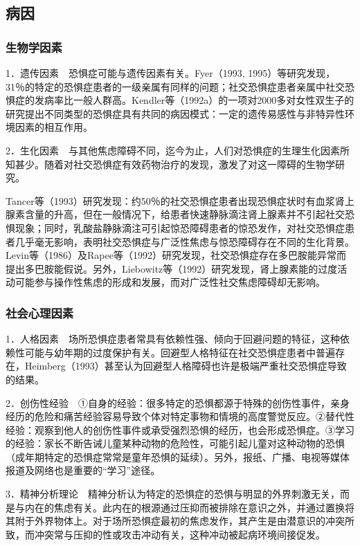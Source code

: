 \subsection{病因}

\subsubsection{生物学因素}

1．遗传因素　恐惧症可能与遗传因素有关。Fyer（1993,
1995）等研究发现，31％的特定的恐惧症患者的一级亲属有同样的问题；社交恐惧症患者亲属中社交恐惧症的发病率比一般人群高。Kendler等（1992a）的一项对2000多对女性双生子的研究提出不同类型的恐惧症具有共同的病因模式：一定的遗传易感性与非特异性环境因素的相互作用。

2．生化因素　与其他焦虑障碍不同，迄今为止，人们对恐惧症的生理生化因素所知甚少。随着对社交恐惧症有效药物治疗的发现，激发了对这一障碍的生物学研究。

Tancer等（1993）研究发现：约50％的社交恐惧症患者出现恐惧症状时有血浆肾上腺素含量的升高，但在一般情况下，给患者快速静脉滴注肾上腺素并不引起社交恐惧现象；同时，乳酸盐静脉滴注可引起惊恐障碍患者的惊恐发作，对社交恐惧症患者几乎毫无影响，表明社交恐惧症与广泛性焦虑与惊恐障碍存在不同的生化背景。Levin等（1986）及Rapee等（1992）研究发现，社交恐惧症存在多巴胺能异常而提出多巴胺能假说。另外，Liebowitz等（1992）研究发现，肾上腺素能的过度活动可能参与操作性焦虑的形成和发展，而对广泛性社交焦虑障碍却无影响。

\subsubsection{社会心理因素}

1．人格因素　场所恐惧症患者常具有依赖性强、倾向于回避问题的特征，这种依赖性可能与幼年期的过度保护有关。回避型人格特征在社交恐惧症患者中普遍存在，Heimberg（1993）甚至认为回避型人格障碍也许是极端严重社交恐惧症导致的结果。

2．创伤性经验　①自身的经验：很多特定的恐惧都源于特殊的创伤性事件，亲身经历的危险和痛苦经验容易导致个体对特定事物和情境的高度警觉反应。②替代性经验：观察到他人的创伤性事件或承受强烈恐惧的经历，也会形成恐惧症。③学习的经验：家长不断告诫儿童某种动物的危险性，可能引起儿童对这种动物的恐惧（成年期特定的恐惧症常常是童年恐惧的延续）。另外，报纸、广播、电视等媒体报道及网络也是重要的“学习”途径。

3．精神分析理论　精神分析认为特定的恐惧症的恐惧与明显的外界刺激无关，而是与内在的焦虑有关。此内在的根源通过压抑而被排除在意识之外，并通过置换将其附于外界物体上。对于场所恐惧症最初的焦虑发作，其产生是由潜意识的冲突所致，而冲突常与压抑的性或攻击冲动有关，这种冲动被起病环境间接促发。

